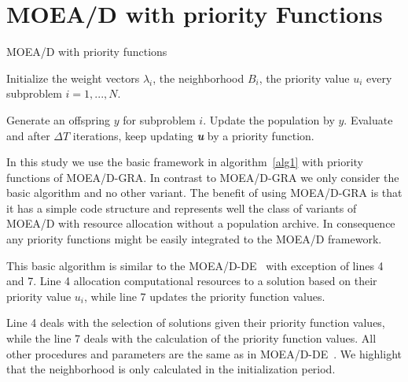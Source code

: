\section{MOEA/D with priority Functions}



\begin{algorithm}[h]
	\caption{MOEA/D with priority functions}\label{alg1}
	\begin{algorithmic}[1]
		
		\State Initialize the weight vectors $\lambda_i$, the neighborhood $B_i$, the priority value $u_i$ every subproblem $i=1,...,N$.
		
		\State Generate an offspring $y$ for subproblem $i$.
		\State Update the population by $y$.
		\EndIf
		\EndFor
		\State  Evaluate and after $\Delta T$ iterations, keep updating \textit{\textbf{u}} by a priority function.
		\EndWhile
	\end{algorithmic}
\end{algorithm}

In this study we use the basic framework in algorithm~\ref{alg1} with priority functions of MOEA/D-GRA. In contrast to MOEA/D-GRA we only consider the basic algorithm and no other variant. The benefit of using MOEA/D-GRA is that it has a simple code structure and represents well the class of variants of MOEA/D with resource allocation without a population archive. In consequence any priority functions might be easily integrated to the MOEA/D framework. 

This basic algorithm is similar to the MOEA/D-DE~\cite{zhang2009performance} with exception of lines 4 and 7. Line 4 allocation computational resources to a solution based on their priority value $u_i$, while line 7 updates the priority function values. 

Line 4 deals with the selection of solutions given their priority function values, while the line 7 deals with the calculation of the priority function values. All other procedures and parameters are the same as in MOEA/D-DE~\cite{li2009multiobjective}. We highlight that the neighborhood is only calculated in the initialization period.

